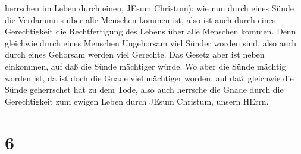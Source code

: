 herrschen im Leben durch einen, JEsum Christum):  wie nun
durch eines Sünde die Verdammnis über alle Menschen kommen ist, also ist
auch durch eines Gerechtigkeit die Rechtfertigung des Lebens über alle
Menschen kommen.  Denn gleichwie durch eines Menschen
Ungehorsam viel Sünder worden sind, also auch durch eines Gehorsam
werden viel Gerechte.  Das Gesetz aber ist neben einkommen,
auf daß die Sünde mächtiger würde. Wo aber die Sünde mächtig worden ist,
da ist doch die Gnade viel mächtiger worden,  auf daß,
gleichwie die Sünde geherrschet hat zu dem Tode, also auch herrsche die
Gnade durch die Gerechtigkeit zum ewigen Leben durch JEsum Christum,
unsern HErrn.

\hypertarget{section-5}{%
\section{6}\label{section-5}}

